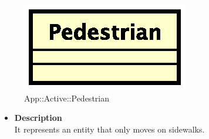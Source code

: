 \begin{figure}[h]
\centering
\includegraphics[scale=0.6,keepaspectratio]{images/solution/pedestrian.eps}
\caption{App::Active::Pedestrian}
\label{fig:sd-app-pedestrian}
\end{figure}
\begin{itemize}
  \item \textbf{Description} \\
It represents an entity that only moves on sidewalks.
\end{itemize} 
